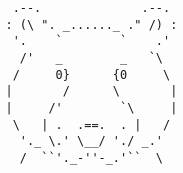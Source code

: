 \documentclass{article}
\begin{document}
\vfill
\centering
\small
\begin{BVerbatim}
    .--.              .--.
   : (\ ". _......_ ." /) :
    '.    `        `    .'
     /'   _        _   `\
    /     0}      {0     \
   |       /      \       |
   |     /'        `\     |
    \   | .  .==.  . |   /
     '._ \.' \__/ './ _.'
     /  ``'._-''-_.'``  \
\end{BVerbatim}
\end{document}
